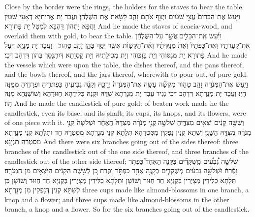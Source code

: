 {Close by the border were the rings, the holders for the staves to bear the table.}{}
{וַיַּ֤עַשׂ אֶת־הַבַּדִּים֙ עֲצֵ֣י שִׁטִּ֔ים וַיְצַ֥ף אֹתָ֖ם זָהָ֑ב לָשֵׂ֖את אֶת־הַשֻּׁלְחָֽן׃}
{וַעֲבַד יָת אֲרִיחַיָּא דְּאָעֵי שִׁטִּין וַחֲפָא יָתְהוֹן דַּהְבָּא לְמִטַּל יָת פָּתוּרָא׃}
{And he made the staves of acacia-wood, and overlaid them with gold, to bear the table.}{}
{וַיַּ֜עַשׂ אֶֽת־הַכֵּלִ֣ים \legarmeh  אֲשֶׁ֣ר עַל־הַשֻּׁלְחָ֗ן אֶת־קְעָרֹתָ֤יו וְאֶת־כַּפֹּתָיו֙ וְאֵת֙ מְנַקִּיֹּתָ֔יו וְאֶ֨ת־הַקְּשָׂוֺ֔ת אֲשֶׁ֥ר יֻסַּ֖ךְ בָּהֵ֑ן זָהָ֖ב טָהֽוֹר׃ \petucha }
{וַעֲבַד יָת מָנַיָּא דְּעַל פָּתוּרָא יָת מְגִסּוֹהִי וְיָת בָּזִכּוֹהִי וְיָת מְכִילָתֵיהּ וְיָת קָסְוָתָא דְּיִתְנַסַּךְ בְּהוֹן דִּדְהַב דְּכֵי׃}
{And he made the vessels which were upon the table, the dishes thereof, and the pans thereof, and the bowls thereof, and the jars thereof, wherewith to pour out, of pure gold.}{}
{וַיַּ֥עַשׂ אֶת־הַמְּנֹרָ֖ה זָהָ֣ב טָה֑וֹר מִקְשָׁ֞ה עָשָׂ֤ה אֶת־הַמְּנֹרָה֙ יְרֵכָ֣הּ וְקָנָ֔הּ גְּבִיעֶ֛יהָ כַּפְתֹּרֶ֥יהָ וּפְרָחֶ֖יהָ מִמֶּ֥נָּה הָיֽוּ׃}
{וַעֲבַד יָת מְנָרְתָא דִּדְהַב דְּכֵי נְגִיד עֲבַד יָת מְנָרְתָא שִׁדַּהּ וּקְנַהּ כַּלִּידַהָא חַזּוּרַהָא וְשׁוֹשַׁנַּהָא מִנַּהּ הֲווֹ׃}
{And he made the candlestick of pure gold: of beaten work made he the candlestick, even its base, and its shaft; its cups, its knops, and its flowers, were of one piece with it.}{}
{וְשִׁשָּׁ֣ה קָנִ֔ים יֹצְאִ֖ים מִצִּדֶּ֑יהָ שְׁלֹשָׁ֣ה \legarmeh  קְנֵ֣י מְנֹרָ֗ה מִצִּדָּהּ֙ הָֽאֶחָ֔ד וּשְׁלֹשָׁה֙ קְנֵ֣י מְנֹרָ֔ה מִצִּדָּ֖הּ הַשֵּׁנִֽי׃}
{וְשִׁתָּא קְנִין נָפְקִין מִסִּטְרַהָא תְּלָתָא קְנֵי מְנָרְתָא מִסִּטְרַהּ חַד וּתְלָתָא קְנֵי מְנָרְתָא מִסִּטְרַהּ תִּנְיָנָא׃}
{And there were six branches going out of the sides thereof: three branches of the candlestick out of the one side thereof, and three branches of the candlestick out of the other side thereof;}{}
{שְׁלֹשָׁ֣ה גְ֠בִעִ֠ים מְֽשֻׁקָּדִ֞ים בַּקָּנֶ֣ה הָאֶחָד֮ כַּפְתֹּ֣ר וָפֶ֒רַח֒ וּשְׁלֹשָׁ֣ה גְבִעִ֗ים מְשֻׁקָּדִ֛ים בְּקָנֶ֥ה אֶחָ֖ד כַּפְתֹּ֣ר וָפָ֑רַח כֵּ֚ן לְשֵׁ֣שֶׁת הַקָּנִ֔ים הַיֹּצְאִ֖ים מִן־הַמְּנֹרָֽה׃}
{תְּלָתָא כַלִּידִין מְצָיְרִין בְּקַנְיָא חַד חַזּוּר וְשׁוֹשָׁן וּתְלָתָא כַלִּידִין מְצָיְרִין בְּקַנְיָא חַד חַזּוּר וְשׁוֹשָׁן כֵּן לְשִׁתָּא קְנִין דְּנָפְקִין מִן מְנָרְתָא׃}
{three cups made like almond-blossoms in one branch, a knop and a flower; and three cups made like almond-blossoms in the other branch, a knop and a flower. So for the six branches going out of the candlestick.}{}
